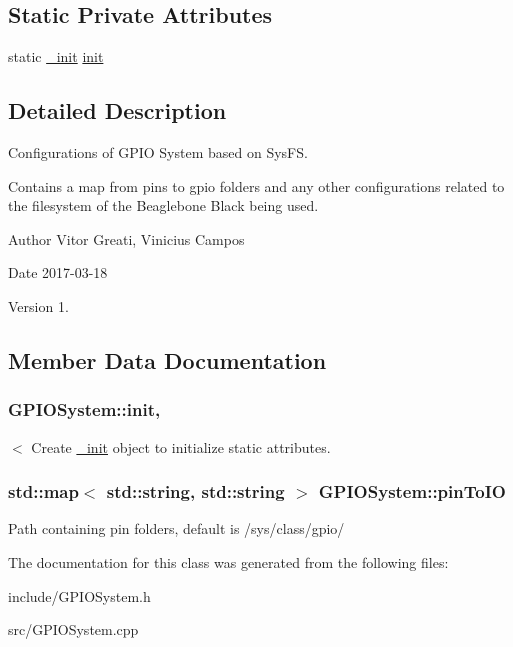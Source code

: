 \subsection*{Static Private Attributes}
\begin{DoxyCompactItemize}
\item 
static \hyperlink{classGPIOSystem_1_1__init}{\-\_\-init} \hyperlink{classGPIOSystem_a4d67c476f8cd6c907c19e1f1e5db3936}{init}
\end{DoxyCompactItemize}


\subsection{Detailed Description}
Configurations of G\-P\-I\-O System based on Sys\-F\-S. 

Contains a map from pins to gpio folders and any other configurations related to the filesystem of the Beaglebone Black being used.

\begin{DoxyAuthor}{Author}
Vitor Greati, Vinicius Campos 
\end{DoxyAuthor}
\begin{DoxyDate}{Date}
2017-\/03-\/18 
\end{DoxyDate}
\begin{DoxyVersion}{Version}
1. 
\end{DoxyVersion}


\subsection{Member Data Documentation}
\hypertarget{classGPIOSystem_a4d67c476f8cd6c907c19e1f1e5db3936}{
\subsubsection[{init}]{ G\-P\-I\-O\-System\-::init\hspace{0.3cm}{\ttfamily [static]}, {\ttfamily [private]}}}\label{classGPIOSystem_a4d67c476f8cd6c907c19e1f1e5db3936}
$<$ Create \hyperlink{classGPIOSystem_1_1__init}{\-\_\-init} object to initialize static attributes. \hypertarget{classGPIOSystem_ad94aecb41bf4030d30402bd425eaa16a}{
\subsubsection[{pin\-To\-I\-O}]{\setlength{\rightskip}{0pt plus 5cm}std\-::map$<$ std\-::string, std\-::string $>$ G\-P\-I\-O\-System\-::pin\-To\-I\-O\hspace{0.3cm}{\ttfamily [static]}}}\label{classGPIOSystem_ad94aecb41bf4030d30402bd425eaa16a}
Path containing pin folders, default is /sys/class/gpio/ 

The documentation for this class was generated from the following files\-:\begin{DoxyCompactItemize}
\item 
include/G\-P\-I\-O\-System.\-h\item 
src/G\-P\-I\-O\-System.\-cpp\end{DoxyCompactItemize}
